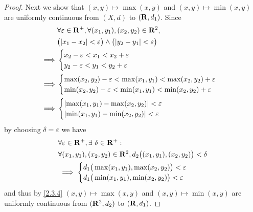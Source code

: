 \begin{proof}
  Next we show that \((x, y) \mapsto \max(x, y)\) and \((x, y) \mapsto \min(x, y)\) are uniformly continuous from \((X, d)\) to \((\mathbf{R}, d_1)\).
  Since
  \begin{align*}
             & \forall \varepsilon \in \R^+, \forall (x_1, y_1), (x_2, y_2) \in \R^2,                \\
             & \big(\abs{x_1 - x_2} < \varepsilon\big) \land \big(\abs{y_2 - y_1} < \varepsilon\big) \\
    \implies & \begin{cases}
                 x_2 - \varepsilon < x_1 < x_2 + \varepsilon \\
                 y_2 - \varepsilon < y_1 < y_2 + \varepsilon \\
               \end{cases}                                           \\
    \implies & \begin{cases}
                 \max(x_2, y_2) - \varepsilon < \max(x_1, y_1) < \max(x_2, y_2) + \varepsilon \\
                 \min(x_2, y_2) - \varepsilon < \min(x_1, y_1) < \min(x_2, y_2) + \varepsilon
               \end{cases}          \\
    \implies & \begin{cases}
                 \abs{\max(x_1, y_1) - \max(x_2, y_2)} < \varepsilon \\
                 \abs{\min(x_1, y_1) - \min(x_2, y_2)} < \varepsilon
               \end{cases}
  \end{align*}
  by choosing \(\delta = \varepsilon\) we have
  \begin{align*}
     & \forall \varepsilon \in \mathbf{R}^+, \exists\ \delta \in \mathbf{R}^+ :                              \\
     & \forall (x_1, y_1), (x_2, y_2) \in \mathbf{R}^2, d_2\big((x_1, y_1), (x_2, y_2)\big) < \delta \\
     & \implies \begin{cases}
                  d_1\big(\max(x_1, y_1), \max(x_2, y_2)\big) < \varepsilon \\
                  d_1\big(\min(x_1, y_1), \min(x_2, y_2)\big) < \varepsilon
                \end{cases}
  \end{align*}
  and thus by \cref{2.3.4} \((x, y) \mapsto \max(x, y)\) and \((x, y) \mapsto \min(x, y)\) are uniformly continuous from \((\mathbf{R}^2, d_2)\) to \((\mathbf{R}, d_1)\).


\end{proof}
